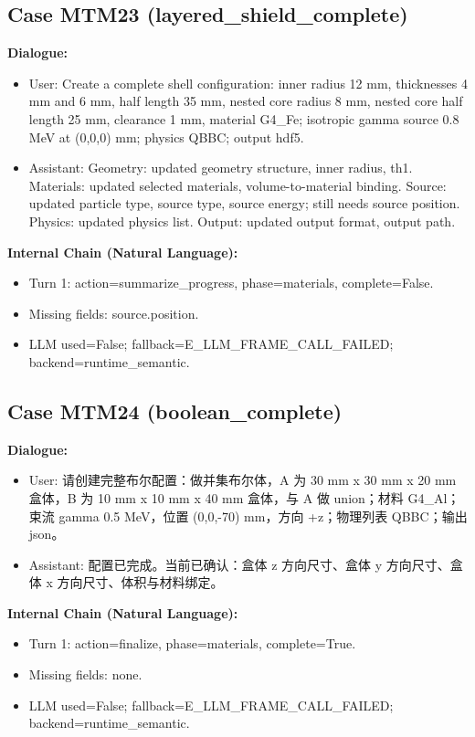 \documentclass[11pt]{ctexart}
\begin{document}
\subsection{Case MTM23 (layered\_shield\_complete)}
\textbf{Dialogue:}
\begin{itemize}
\item User: Create a complete shell configuration: inner radius 12 mm, thicknesses 4 mm and 6 mm, half length 35 mm, nested core radius 8 mm, nested core half length 25 mm, clearance 1 mm, material G4\_Fe; isotropic gamma source 0.8 MeV at (0,0,0) mm; physics QBBC; output hdf5.
\item Assistant: Geometry: updated geometry structure, inner radius, th1. Materials: updated selected materials, volume-to-material binding. Source: updated particle type, source type, source energy; still needs source position. Physics: updated physics list. Output: updated output format, output path.
\end{itemize}
\textbf{Internal Chain (Natural Language):}
\begin{itemize}
\item Turn 1: action=summarize\_progress, phase=materials, complete=False.
\item Missing fields: source.position.
\item LLM used=False; fallback=E\_LLM\_FRAME\_CALL\_FAILED; backend=runtime\_semantic.
\end{itemize}
\subsection{Case MTM24 (boolean\_complete)}
\textbf{Dialogue:}
\begin{itemize}
\item User: 请创建完整布尔配置：做并集布尔体，A 为 30 mm x 30 mm x 20 mm 盒体，B 为 10 mm x 10 mm x 40 mm 盒体，与 A 做 union；材料 G4\_Al；束流 gamma 0.5 MeV，位置 (0,0,-70) mm，方向 +z；物理列表 QBBC；输出 json。
\item Assistant: 配置已完成。当前已确认：盒体 z 方向尺寸、盒体 y 方向尺寸、盒体 x 方向尺寸、体积与材料绑定。
\end{itemize}
\textbf{Internal Chain (Natural Language):}
\begin{itemize}
\item Turn 1: action=finalize, phase=materials, complete=True.
\item Missing fields: none.
\item LLM used=False; fallback=E\_LLM\_FRAME\_CALL\_FAILED; backend=runtime\_semantic.
\end{itemize}
\end{document}
